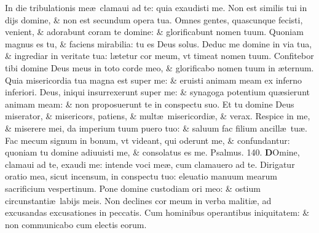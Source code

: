 \documentclass[a5paper,10pt]{book}
\def\ae{æ}
\begin{document}
\begin{multicols*}{2}
\newline \color{red} I\color{black}n die tribulationis me\ae \ clamaui ad te: quia exaudisti me.
\newline \color{red} N\color{black}on est similis tui in dijs domine, \& non est secundum opera tua.
\newline \color{red} O\color{black}mnes gentes, quascunque fecisti, venient, \& adorabunt coram te domine: \& glorificabunt nomen tuum.
\newline \color{red} Q\color{black}uoniam magnus es tu, \& faciens mirabilia: tu es Deus solus.
\newline \color{red} D\color{black}educ me domine in via tua, \& ingrediar in veritate tua: l\ae tetur cor meum, vt timeat nomen tuum.
\newline \color{red} C\color{black}onfitebor tibi domine Deus meus in toto corde meo, \& glorificabo nomen tuum in \ae ternum.
\newline \color{red} Q\color{black}uia misericordia tua magna est super me: \& eruisti animam meam ex inferno inferiori.
\newline \color{red} D\color{black}eus, iniqui insurrexerunt super me: \& synagoga potentium qu\ae sierunt animam meam: \& non proposuerunt te in conspectu suo.
\newline \color{red} E\color{black}t tu domine Deus miserator, \& misericors, patiens, \& mult\ae \ misericordi\ae , \& verax.
\newline \color{red} R\color{black}espice in me, \& miserere mei, da imperium tuum puero tuo: \& saluum fac filium ancill\ae \ tu\ae .
\newline \color{red} F\color{black}ac mecum signum in bonum, vt videant, qui oderunt me, \& confundantur: quoniam tu domine adiuuisti me, \& consolatus es me. \quad \color{red} Psalmus. \hypertarget{ps140}{140.} \color{black}
\vspace{-.5em}
\lettrine[lines=2]{\bfseries \color{red} D}{}Omine, clamaui ad te, exaudi me: intende voci me\ae , cum clamauero ad te.
\newline \color{red} D\color{black}irigatur oratio mea, sicut incensum, in conspectu tuo: eleuatio manuum mearum sacrificium vespertinum.
\newline \color{red} P\color{black}one domine custodiam ori meo: \& ostium circunstanti\ae \ labijs meis.
\newline \color{red} N\color{black}on declines cor meum in verba maliti\ae , ad excusandas excusationes in peccatis.
\newline \color{red} C\color{black}um hominibus operantibus iniquitatem: \& non communicabo cum electis eorum.

\end{multicols*}
\end{document}
